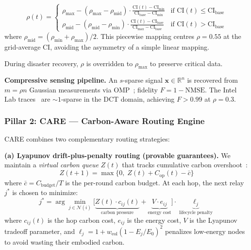 \begin{equation}
    \rho(t) = \begin{cases}
        \rho_{\max} - (\rho_{\max} - \rho_{\text{mid}}) \cdot \frac{\text{CI}(t) - \text{CI}_{\min}}{\text{CI}_{\text{base}} - \text{CI}_{\min}} & \text{if } \text{CI}(t) \leq \text{CI}_{\text{base}} \\[6pt]
        \rho_{\text{mid}} - (\rho_{\text{mid}} - \rho_{\min}) \cdot \frac{\text{CI}(t) - \text{CI}_{\text{base}}}{\text{CI}_{\max} - \text{CI}_{\text{base}}} & \text{if } \text{CI}(t) > \text{CI}_{\text{base}}
    \end{cases}
    \label{art2:eq:rho}
\end{equation}
where $\rho_{\text{mid}} = (\rho_{\min} + \rho_{\max}) / 2$.
This piecewise mapping centres $\rho = 0.55$ at the grid-average CI, avoiding the asymmetry of a simple linear mapping.

During disaster recovery, $\rho$ is overridden to $\rho_{\max}$ to preserve critical data.

\textbf{Compressive sensing pipeline.}
An $s$-sparse signal $\mathbf{x} \in \mathbb{R}^n$ is recovered from $m{=}\rho n$ Gaussian measurements via OMP~\cite{candes2006cs, tropp2007omp}; fidelity $F = 1 - \text{NMSE}$.
The Intel Lab traces~\cite{intel_lab_data} are ${\sim}1$-sparse in the DCT domain, achieving $F > 0.99$ at $\rho = 0.3$.

\subsubsection{Pillar 2: CARE --- Carbon-Aware Routing Engine}
\label{art2:sec:care}

CARE combines two complementary routing strategies:

\textbf{(a) Lyapunov drift-plus-penalty routing (provable guarantees).}
We maintain a \emph{virtual carbon queue} $Z(t)$ that tracks cumulative carbon overshoot~\cite{neely2010lyapunov}:
\begin{equation}
    Z(t+1) = \max\big\{0, \; Z(t) + C_{\text{op}}(t) - \bar{c}\big\}
    \label{art2:eq:queue_update}
\end{equation}
where $\bar{c} = C_{\text{budget}} / T$ is the per-round carbon budget.
At each hop, the next relay $j^*$ is chosen to minimize:
\begin{equation}
    j^* = \arg\min_{j \in \mathcal{N}(i)} \Big[\underbrace{Z(t) \cdot c_{ij}(t)}_{\text{carbon pressure}} + \underbrace{V \cdot e_{ij}}_{\text{energy cost}}\Big] \cdot \underbrace{\ell_j}_{\text{lifecycle penalty}}
    \label{art2:eq:lyapunov_decision}
\end{equation}
where $c_{ij}(t)$ is the hop carbon cost, $e_{ij}$ is the energy cost, $V$ is the Lyapunov tradeoff parameter, and $\ell_j = 1 + w_{\text{eol}}(1 - E_j/E_0)^2$ penalizes low-energy nodes to avoid wasting their embodied carbon.

